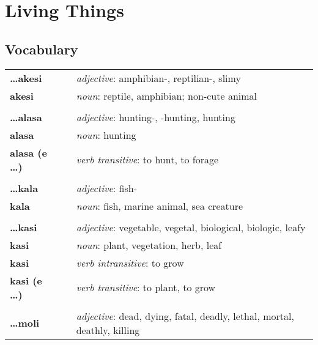\section{Living Things}
%
\subsection*{Vocabulary}
%
\begin{supertabular}{p{2,5cm}|ll}
%
\textbf{\dots akesi} && \textit{adjective}: amphibian-, reptilian-, slimy \\ %
\textbf{akesi} && \textit{noun}: reptile, amphibian; non-cute animal \\ %
 && \\ %
%
\textbf{\dots alasa} && \textit{adjective}: hunting-, -hunting, hunting \\ %
\textbf{alasa} && \textit{noun}: hunting \\ %
\textbf{alasa (e \dots)} && \textit{verb transitive}: to hunt, to forage \\ %
 && \\ %
%
\textbf{\dots kala} && \textit{adjective}: fish- \\ %
\textbf{kala} && \textit{noun}: fish, marine animal, sea creature \\ %
 && \\ %
%
\textbf{\dots kasi} && \textit{adjective}: vegetable, vegetal, biological, biologic, leafy \\ %
\textbf{kasi} && \textit{noun}: plant, vegetation, herb, leaf \\ %
\textbf{kasi} && \textit{verb intransitive}: to grow \\ %
\textbf{kasi (e \dots)} && \textit{verb transitive}: to plant, to grow \\ %
 && \\ %
%
\textbf{\dots moli} && \textit{adjective}: dead, dying, fatal, deadly, lethal, mortal, deathly, killing \\ %

\end{supertabular}
